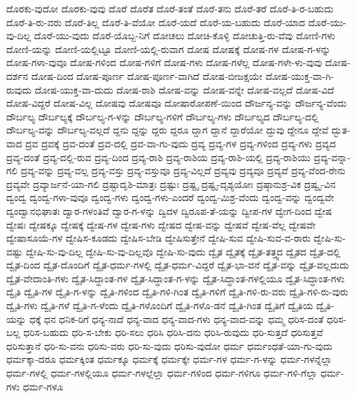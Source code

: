 {ದೊರಕು-ವುದೋ
ದೊರಕು-ವುವು
ದೊರೆ
ದೊರೆತ
ದೊರೆ-ತಂತೆ
ದೊರೆ-ತನು
ದೊರೆ-ತರೆ
ದೊರೆ-ತಿ-ರ-ಬಹುದು
ದೊರೆ-ತಿ-ರು-ವರು
ದೊರೆ-ತಿಲ್ಲ
ದೊರೆ-ತಿ-ವೆಯೋ
ದೊರೆ-ಯದೆ
ದೊರೆ-ಯ-ಬಹುದು
ದೊರೆ-ಯಾದ
ದೊರೆ-ಯು-ವು-ದಿಲ್ಲ
ದೊರೆ-ಯು-ವುದು
ದೊರೆ-ಯೊಬ್ಬ-ನಿಗೆ
ದೋಚಲು
ದೋಚಿ-ಕೊಳ್ಳಿ
ದೋಚುತ್ತಿ-ರು-ವೆವು
ದೋಣಿ-ಗಳು
ದೋಣಿ-ಯನ್ನು
ದೋಣಿ-ಯಲ್ಲಿಟ್ಟೂ
ದೋಣಿ-ಯಲ್ಲಿ-ರುವಾಗ
ದೋಷ
ದೋಷಕ್ಕೆ
ದೋಷ-ಗಳ
ದೋಷ-ಗ-ಳನ್ನು
ದೋಷ-ಗಳಾ-ವುವೂ
ದೋಷ-ಗಳಿಂದ
ದೋಷ-ಗಳಿಗೆ
ದೋಷ-ಗಳು
ದೋಷ-ಗಳೆಲ್ಲ
ದೋಷ-ಗಳೇ-ಳು-ವುವು
ದೋಷ-ದರ್ಶನ
ದೋಷ-ದಿಂದ
ದೋಷ-ಪೂರ್ಣ
ದೋಷ-ಪೂರ್ಣ-ವಾಗಿದೆ
ದೋಷ-ಬೀಜಕ್ಷಯೇ
ದೋಷ-ಯುಕ್ತ-ವಾ-ಗಿ-ರುವುದು
ದೋಷ-ಯುಕ್ತ-ವಾ-ದುದು
ದೋಷ-ರಾಶಿ
ದೋಷ-ವನ್ನು
ದೋಷ-ವನ್ನೇ
ದೋಷ-ವಲ್ಲದೆ
ದೋಷ-ವಿದೆ
ದೋಷ-ವಿದ್ದರೆ
ದೋಷ-ವಿಲ್ಲ
ದೋಷವು
ದೋಷವೂ
ದೋಷಾರೋಪಣೆ-ಯಿಂದ
ದೌರ್ಜನ್ಯ-ವನ್ನು
ದೌರ್ಜನ್ಯ-ವೆಂದು
ದೌರ್ಬಲ್ಯ
ದೌರ್ಬಲ್ಯಕ್ಕೆ
ದೌರ್ಬಲ್ಯ-ಗ-ಳನ್ನು
ದೌರ್ಬಲ್ಯ-ಗಳಿಗೆ
ದೌರ್ಬಲ್ಯ-ಗಳು
ದೌರ್ಬಲ್ಯದ
ದೌರ್ಬಲ್ಯ-ದಲ್ಲಿ
ದೌರ್ಬಲ್ಯ-ವನ್ನು
ದೌರ್ಬಲ್ಯ-ವಲ್ಲದೆ
ದ್ದನು
ದ್ದನ್ನು
ದ್ದರು
ದ್ದರೂ
ದ್ದಾಗ
ದ್ದಾನೆ
ದ್ದಾರೆಯೋ
ದ್ದುವು
ದ್ದೇನೂ
ದ್ದೇವೆ
ದ್ಭುತ-ವಾದ
ದ್ರವ
ದ್ರವಕ್ಕೆ
ದ್ರವ-ದಂತೆ
ದ್ರವ-ದಲ್ಲಿ
ದ್ರವ-ವಾ-ಗು-ವುದು
ದ್ರವ್ಯ
ದ್ರವ್ಯ-ಗಳ
ದ್ರವ್ಯ-ಗಳಿಂದ
ದ್ರವ್ಯ-ಗಳು
ದ್ರವ್ಯದ
ದ್ರವ್ಯ-ದಂತೆ
ದ್ರವ್ಯ-ದಲ್ಲಿ-ರುವ
ದ್ರವ್ಯ-ದಿಂದ
ದ್ರವ್ಯ-ರಾಶಿ
ದ್ರವ್ಯ-ರಾಶಿಯ
ದ್ರವ್ಯ-ರಾಶಿ-ಯಲ್ಲಿ
ದ್ರವ್ಯ-ರಾಶಿಯು
ದ್ರವ್ಯ-ವನ್ನಾ-ಗಲಿ
ದ್ರವ್ಯ-ವನ್ನು
ದ್ರವ್ಯ-ವಲ್ಲ
ದ್ರವ್ಯ-ವಸ್ತು
ದ್ರವ್ಯ-ವಸ್ತುವೂ
ದ್ರವ್ಯ-ವಿಲ್ಲದೆ
ದ್ರವ್ಯವು
ದ್ರವ್ಯವೂ
ದ್ರವ್ಯವೆ
ದ್ರವ್ಯ-ವೆಂದ-ರೇನು
ದ್ರವ್ಯವೇ
ದ್ರವ್ಯಾರ್ಜನೆ-ಯಾ-ಗಲಿ
ದ್ರಷ್ಟಾದೃಶಿ-ಮಾತ್ರಃ
ದ್ರಷ್ಟುಃ
ದ್ರಷ್ಟೃ
ದ್ರಷ್ಟೃ-ದೃಶ್ಯಯೋಃ
ದ್ರಷ್ಠಾನುಶ್ರ-ವಿಕ
ದ್ರಷ್ವೃ-ವಿನ
ದ್ವಂದ್ವ
ದ್ವಂದ್ವ-ಗಳಾ-ವುವೂ
ದ್ವಂದ್ವ-ಗಳು
ದ್ವಂದ್ವ-ಗಳು-ಎಂದರೆ
ದ್ವಂದ್ವ-ಮಿಶ್ರ-ವೆಂದು
ದ್ವಂದ್ವ-ವನ್ನು
ದ್ವಂದ್ವವೇ
ದ್ವಂದ್ವಾನಭಿಘಾತಃ
ದ್ವಾರ-ಗಳಂತಿವೆ
ದ್ವಾರ-ಗ-ಳನ್ನು
ದ್ವಿದಳ
ದ್ವಿರೂಪ-ತೆ-ಯನ್ನು
ದ್ವೀಪ-ಗಳ
ದ್ವೇಗ-ದಿಂದ
ದ್ವೇಷ
ದ್ವೇಷಃ
ದ್ವೇಷಕ್ಕೂ
ದ್ವೇಷಕ್ಕೆ
ದ್ವೇಷ-ಗಳ
ದ್ವೇಷ-ಗಳು
ದ್ವೇಷದ
ದ್ವೇಷ-ವನ್ನು
ದ್ವೇಷವೆ
ದ್ವೇಷ-ವೆಲ್ಲ
ದ್ವೇಷವೇ
ದ್ವೇಷಾಸೂಯೆ-ಗಳ
ದ್ವೇಷಿಸ-ಕೂಡದು
ದ್ವೇಷಿಸ-ಬೇಡಿ
ದ್ವೇಷಿಸುತ್ತೇನೆ
ದ್ವೇಷಿ-ಸುವ
ದ್ವೇಷಿ-ಸುವ-ವ-ರಾರು
ದ್ವೇಷಿ-ಸು-ವಷ್ಟು
ದ್ವೇಷಿ-ಸು-ವು-ದಿಲ್ಲ
ದ್ವೇಷಿ-ಸು-ವು-ದಿಲ್ಲವೊ
ದ್ವೇಷಿ-ಸು-ವುದು
ದ್ವೈತ
ದ್ವೈತಕ್ಕೆ
ದ್ವೈತ-ತತ್ತ್ವದ
ದ್ವೈತದ
ದ್ವೈತ-ದಲ್ಲಿ
ದ್ವೈತ-ದಿಂದ
ದ್ವೈತ-ದೊಂದಿಗೆ
ದ್ವೈತ-ಧರ್ಮ-ಗಳಲ್ಲಿ
ದ್ವೈತ-ಧರ್ಮ-ವಿದ್ದರೆ
ದ್ವೈತ-ಭಾ-ವನೆ
ದ್ವೈತ-ವನ್ನು
ದ್ವೈತ-ವಲ್ಲದುದು
ದ್ವೈತ-ವೇದಾಂತಿ-ಗಳು
ದ್ವೈತ-ಸಿದ್ಧಾಂತ-ಗಳ
ದ್ವೈತ-ಸಿದ್ಧಾಂತ-ಗ-ಳನ್ನು
ದ್ವೈತ-ಸಿದ್ಧಾಂತ-ಗಳಲ್ಲಿಯೂ
ದ್ವೈತ-ಸಿದ್ಧಾಂತ-ಗಳು
ದ್ವೈತಿ
ದ್ವೈತಿ-ಗಳ
ದ್ವೈತಿ-ಗ-ಳನ್ನು
ದ್ವೈತಿ-ಗಳಿಂದ
ದ್ವೈತಿ-ಗಳಿ-ಗಿಂತ
ದ್ವೈತಿ-ಗಳಿಗೆ
ದ್ವೈತಿ-ಗಳಿ-ರು-ವರು
ದ್ವೈತಿ-ಗಳಿ-ರು-ವುರು
ದ್ವೈತಿ-ಗಳು
ದ್ವೈತಿ-ಗಳೆ
ದ್ವೈತಿ-ಗ-ಳೆಂದು
ದ್ವೈತಿ-ಗಳೊಂದಿಗೆ
ದ್ವೈತಿ-ಗಳೊ-ಡನೆ
ದ್ವೈತಿ-ಗಿಂತ
ದ್ವೈತಿಗೆ
ದ್ವೈತಿಯ
ದ್ವೈತಿ-ಯನ್ನು
ಧಕ್ಕೆ
ಧನ
ಧನಿಕ-ರಿಗೆ
ಧನ್ಯ-ನಾದೆ
ಧನ್ಯ-ವಾದ
ಧನ್ಯ-ವಾದ-ಗಳು
ಧನ್ಯ-ವಾದ-ವನ್ನು
ಧಮ್ಮ
ಧರಿಸ-ದಂತೆ
ಧರಿಸ-ಬಲ್ಲ
ಧರಿಸ-ಬಹುದು
ಧರಿ-ಸ-ಬೇಕು
ಧರಿ-ಸಲು
ಧರಿಸಿ
ಧರಿಸಿ-ದನು
ಧರಿಸಿ-ರುವುದು
ಧರಿ-ಸುತ್ತದೆ
ಧರಿಸುತ್ತವೆ
ಧರಿಸುತ್ತಾನೆ
ಧರಿ-ಸು-ವನು
ಧರಿಸು-ವರು
ಧರಿ-ಸು-ವುದು
ಧರಿಸು-ವುದೋ
ಧರ್ಮ
ಧರ್ಮಂಧತೆ-ಯಾ-ಗು-ವುದು
ಧರ್ಮಕ್ಕಾ-ದರೂ
ಧರ್ಮಕ್ಕಿಂತ
ಧರ್ಮಕ್ಕೂ
ಧರ್ಮಕ್ಕೆ
ಧರ್ಮಕ್ಕೇ
ಧರ್ಮ-ಗಳ
ಧರ್ಮ-ಗ-ಳನ್ನು
ಧರ್ಮ-ಗಳನ್ನೆಲ್ಲಾ
ಧರ್ಮ-ಗಳಲ್ಲಿ
ಧರ್ಮ-ಗಳಲ್ಲಿಯೂ
ಧರ್ಮ-ಗಳಲ್ಲೆಲ್ಲಾ
ಧರ್ಮ-ಗಳಿಂದ
ಧರ್ಮ-ಗಳಿಗೂ
ಧರ್ಮ-ಗಳಿ-ಗೆಲ್ಲಾ
ಧರ್ಮ-ಗಳು
ಧರ್ಮ-ಗಳೂ
}
